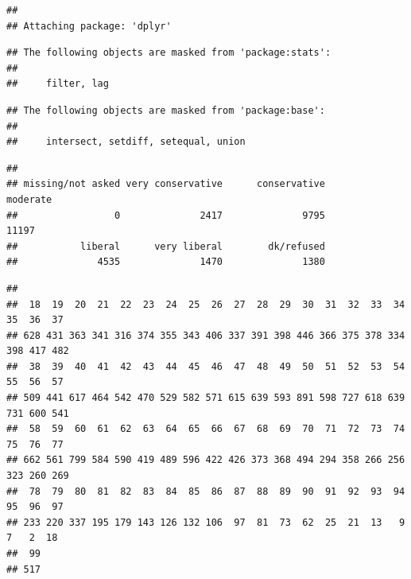 \documentclass[
]{book}
\newenvironment{Shaded}{\begin{snugshade}}{\end{snugshade}}
\newcommand{\CommentTok}[1]{\textcolor[rgb]{0.56,0.35,0.01}{\textit{#1}}}
\newcommand{\DocumentationTok}[1]{\textcolor[rgb]{0.56,0.35,0.01}{\textbf{\textit{#1}}}}
\newcommand{\FunctionTok}[1]{\textcolor[rgb]{0.00,0.00,0.00}{#1}}
\newcommand{\NormalTok}[1]{#1}
\newcommand{\OtherTok}[1]{\textcolor[rgb]{0.56,0.35,0.01}{#1}}
\newcommand{\SpecialCharTok}[1]{\textcolor[rgb]{0.00,0.00,0.00}{#1}}
\newcommand{\StringTok}[1]{\textcolor[rgb]{0.31,0.60,0.02}{#1}}
\theoremstyle{definition}
\theoremstyle{definition}
\theoremstyle{definition}
\theoremstyle{definition}
\theoremstyle{remark}
\begin{document}
\begin{verbatim}
## 
## Attaching package: 'dplyr'
\end{verbatim}

\begin{verbatim}
## The following objects are masked from 'package:stats':
## 
##     filter, lag
\end{verbatim}

\begin{verbatim}
## The following objects are masked from 'package:base':
## 
##     intersect, setdiff, setequal, union
\end{verbatim}

\begin{Shaded}
\end{Shaded}

\begin{verbatim}
## 
## missing/not asked very conservative      conservative          moderate 
##                 0              2417              9795             11197 
##           liberal      very liberal        dk/refused 
##              4535              1470              1380
\end{verbatim}

\begin{Shaded}
\end{Shaded}

\begin{verbatim}
## 
##  18  19  20  21  22  23  24  25  26  27  28  29  30  31  32  33  34  35  36  37 
## 628 431 363 341 316 374 355 343 406 337 391 398 446 366 375 378 334 398 417 482 
##  38  39  40  41  42  43  44  45  46  47  48  49  50  51  52  53  54  55  56  57 
## 509 441 617 464 542 470 529 582 571 615 639 593 891 598 727 618 639 731 600 541 
##  58  59  60  61  62  63  64  65  66  67  68  69  70  71  72  73  74  75  76  77 
## 662 561 799 584 590 419 489 596 422 426 373 368 494 294 358 266 256 323 260 269 
##  78  79  80  81  82  83  84  85  86  87  88  89  90  91  92  93  94  95  96  97 
## 233 220 337 195 179 143 126 132 106  97  81  73  62  25  21  13   9   7   2  18 
##  99 
## 517
\end{verbatim}
\end{document}
